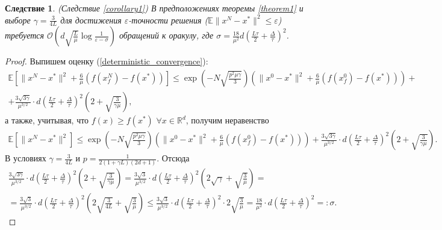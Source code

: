 \documentclass{article}
\newtheorem{corollary}{Следствие}
\begin{document}
\begin{corollary} \label{corollary1_appendix} (Следствие \ref{corollary1})
 В предположениях теоремы \ref{theorem1} и выборе $\gamma = \frac{3}{4L}$ для достижения $\varepsilon$-точности решения ($\mathbb{E} \|x^N - x^*\|^2 \leqslant \varepsilon$) требуется $\mathcal{O}\left(d \sqrt{\frac{L}{\mu}} \log \frac{1}{\varepsilon - \sigma}\right)$ обращений к оракулу, где $\sigma = \frac{18}{\mu^2} d \left(\frac{L \tau}{2} + \frac{\Delta}{\tau}\right)^2$.
\end{corollary}
\begin{proof}
 Выпишем оценку (\ref{deterministic_convergence}):
   \begin{equation*}
   \begin{aligned}
   \mathbb{E}\left[\|x^N - x^*\|^2 + \frac{6}{\mu} (f(x_f^N) - f(x^*))\right] \leqslant \exp\left(- N\sqrt{\frac{p^2\mu\gamma}{3}}\right) \left(\|x^0 - x^*\|^2 + \frac{6}{\mu} (f(x_f^0) - f(x^*))\right) +\\ +\frac{3 \sqrt{3\gamma}}{\mu^{3/2}} \cdot d \left(\frac{L\tau}{2} + \frac{\Delta}{\tau}\right)^2\left(2 + \sqrt{\frac{3}{\gamma\mu}}\right),
   \end{aligned}
  \end{equation*}
  а также, учитывая, что $f(x) \geqslant f(x^*)$ $\forall x \in \mathbb{R}^d$, получим неравенство
  \begin{equation}
   \begin{aligned}
   \mathbb{E}[\|x^N - x^*\|^2] \leqslant \exp\left(- N\sqrt{\frac{p^2\mu\gamma}{3}}\right) \left(\|x^0 - x^*\|^2 + \frac{6}{\mu} (f(x_f^0) - f(x^*))\right) + \frac{3 \sqrt{3\gamma}}{\mu^{3/2}} \cdot d \left(\frac{L\tau}{2} + \frac{\Delta}{\tau}\right)^2\left(2 + \sqrt{\frac{3}{\gamma\mu}}\right).
   \label{corollary1_estimate}
   \end{aligned}
  \end{equation}
  В условиях $\gamma = \frac{3}{4L}$ и $p = \frac{1}{2 (1 + \gamma L) (2d + 1)}$. Отсюда
  \begin{equation*}
   \begin{aligned}
    \frac{3 \sqrt{3\gamma}}{\mu^{3/2}} \cdot d \left(\frac{L\tau}{2} + \frac{\Delta}{\tau}\right)^2\left(2 + \sqrt{\frac{3}{\gamma\mu}}\right) = \frac{3 \sqrt{3}}{\mu^{3/2}} \cdot d \left(\frac{L\tau}{2} + \frac{\Delta}{\tau}\right)^2\left(2\sqrt{\gamma} + \sqrt{\frac{3}{\mu}}\right) = \\ = \frac{3 \sqrt{3}}{\mu^{3/2}} \cdot d \left(\frac{L\tau}{2} + \frac{\Delta}{\tau}\right)^2\left(2\sqrt{\frac{3}{4L}} + \sqrt{\frac{3}{\mu}}\right) \leqslant \frac{3 \sqrt{3}}{\mu^{3/2}} \cdot d \left(\frac{L\tau}{2} + \frac{\Delta}{\tau}\right)^2 \cdot 2 \sqrt{\frac{3}{\mu}} = \frac{18}{\mu^2} \cdot d \left(\frac{L\tau}{2} + \frac{\Delta}{\tau}\right)^2 =: \sigma.

\end{aligned}
\end{equation*}
\end{proof}
\end{document}
